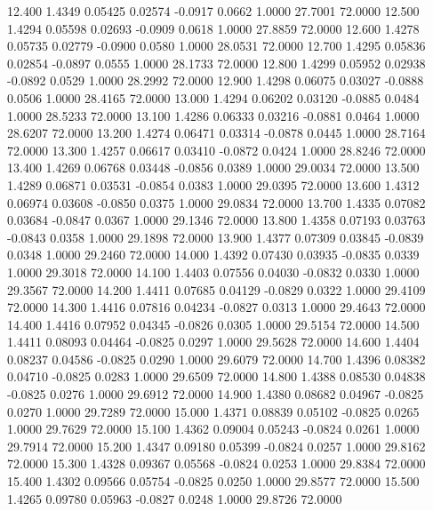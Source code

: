   12.400   1.4349   0.05425   0.02574  -0.0917   0.0662   1.0000  27.7001  72.0000
  12.500   1.4294   0.05598   0.02693  -0.0909   0.0618   1.0000  27.8859  72.0000
  12.600   1.4278   0.05735   0.02779  -0.0900   0.0580   1.0000  28.0531  72.0000
  12.700   1.4295   0.05836   0.02854  -0.0897   0.0555   1.0000  28.1733  72.0000
  12.800   1.4299   0.05952   0.02938  -0.0892   0.0529   1.0000  28.2992  72.0000
  12.900   1.4298   0.06075   0.03027  -0.0888   0.0506   1.0000  28.4165  72.0000
  13.000   1.4294   0.06202   0.03120  -0.0885   0.0484   1.0000  28.5233  72.0000
  13.100   1.4286   0.06333   0.03216  -0.0881   0.0464   1.0000  28.6207  72.0000
  13.200   1.4274   0.06471   0.03314  -0.0878   0.0445   1.0000  28.7164  72.0000
  13.300   1.4257   0.06617   0.03410  -0.0872   0.0424   1.0000  28.8246  72.0000
  13.400   1.4269   0.06768   0.03448  -0.0856   0.0389   1.0000  29.0034  72.0000
  13.500   1.4289   0.06871   0.03531  -0.0854   0.0383   1.0000  29.0395  72.0000
  13.600   1.4312   0.06974   0.03608  -0.0850   0.0375   1.0000  29.0834  72.0000
  13.700   1.4335   0.07082   0.03684  -0.0847   0.0367   1.0000  29.1346  72.0000
  13.800   1.4358   0.07193   0.03763  -0.0843   0.0358   1.0000  29.1898  72.0000
  13.900   1.4377   0.07309   0.03845  -0.0839   0.0348   1.0000  29.2460  72.0000
  14.000   1.4392   0.07430   0.03935  -0.0835   0.0339   1.0000  29.3018  72.0000
  14.100   1.4403   0.07556   0.04030  -0.0832   0.0330   1.0000  29.3567  72.0000
  14.200   1.4411   0.07685   0.04129  -0.0829   0.0322   1.0000  29.4109  72.0000
  14.300   1.4416   0.07816   0.04234  -0.0827   0.0313   1.0000  29.4643  72.0000
  14.400   1.4416   0.07952   0.04345  -0.0826   0.0305   1.0000  29.5154  72.0000
  14.500   1.4411   0.08093   0.04464  -0.0825   0.0297   1.0000  29.5628  72.0000
  14.600   1.4404   0.08237   0.04586  -0.0825   0.0290   1.0000  29.6079  72.0000
  14.700   1.4396   0.08382   0.04710  -0.0825   0.0283   1.0000  29.6509  72.0000
  14.800   1.4388   0.08530   0.04838  -0.0825   0.0276   1.0000  29.6912  72.0000
  14.900   1.4380   0.08682   0.04967  -0.0825   0.0270   1.0000  29.7289  72.0000
  15.000   1.4371   0.08839   0.05102  -0.0825   0.0265   1.0000  29.7629  72.0000
  15.100   1.4362   0.09004   0.05243  -0.0824   0.0261   1.0000  29.7914  72.0000
  15.200   1.4347   0.09180   0.05399  -0.0824   0.0257   1.0000  29.8162  72.0000
  15.300   1.4328   0.09367   0.05568  -0.0824   0.0253   1.0000  29.8384  72.0000
  15.400   1.4302   0.09566   0.05754  -0.0825   0.0250   1.0000  29.8577  72.0000
  15.500   1.4265   0.09780   0.05963  -0.0827   0.0248   1.0000  29.8726  72.0000
